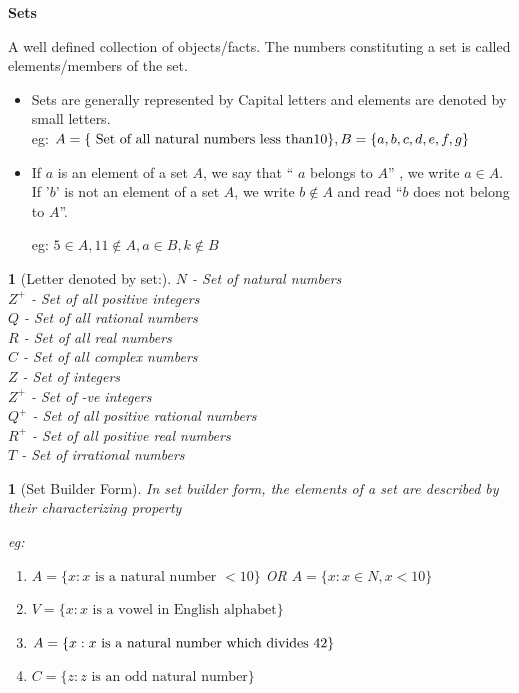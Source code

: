 \documentclass[12pt]{article}
\theoremstyle{colored}
\newtheorem*{defn}{}
\theoremstyle{subcolored}
\newtheorem*{subdefn}{}
\begin{document}
\begin{center}
  {\LARGE \textbf{Sets}} \\
  
\end{center}
\begin{multicols}{2}


A well defined collection of objects/facts. The numbers constituting a set is called elements/members of
the set.

\begin{itemize}
    \item   Sets are generally represented by Capital letters and
    elements are denoted by small letters.\\
            eg: $A = \{\text{ Set of all natural numbers less than}\\10 \}, B =\{a,b,c,d,e,f,g\}$
    \item If $a$ is an element of a set $A$, we say that “ $a$ belongs to $A$” , we write $a \in A$. If '$b$' is not
    an element of a set $A$, we write $b \notin A$ and read “$b$ does not belong to $A$”. 

    eg: $5 \in A , 11 \notin A, a \in B , k \notin B$
\end{itemize}
\begin{subdefn}[Letter denoted by set:]
    \hfill \break
       $N$ -  Set of natural numbers \\
       $Z^+$ -  Set of all positive integers\\
       $Q$ -  Set of all rational numbers \\
       $R$ -  Set of all real numbers\\
       $C$ -  Set of all complex numbers\\
       $Z$ - Set of integers\\
       $Z^+$ - Set of -ve integers\\
      $ Q^+$ - Set of all positive rational numbers\\
       $R^+$ - Set of all positive real numbers\\
       $T $ - Set of irrational numbers

\end{subdefn}

\begin{defn}[\large Set Builder Form]
    \hfill \break
 In set builder form, the elements
of a set are described by their characterizing property

eg:
\begin{enumerate}
    \item[a)] $A = \{x: x \text{ is a natural number }<10\}$ OR  $A=\{x: x \in N,x<10 \}$
    \item[b)] $V = \{x : x \text{ is a vowel in English alphabet}\}$
    \item[c)] $A= \{x : x \text{ is a natural number which divides }\\42\}$
    \item[d)] $C= \{z : z \text{ is an odd natural number}\}$ 
\end{enumerate}


\end{defn}
\end{multicols}
\end{document}
